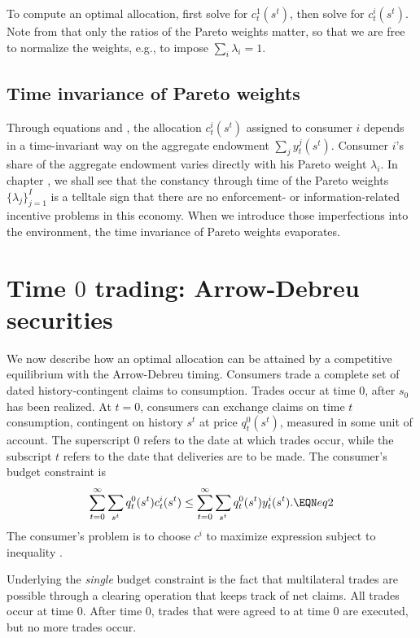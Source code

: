  To compute an optimal allocation, first solve  
for $c_t^1(s^t)$, then solve  for $c_t^i(s^t)$.
Note  from  that only the ratios of the Pareto weights matter,
so that we are free to normalize the weights, e.g., to impose
$\sum_i \lambda_i=1$.



\subsection{Time invariance of Pareto weights}
  Through  equations  and ,
the allocation $c_t^i(s^t)$ assigned to consumer $i$
depends in a time-invariant way on the aggregate endowment
$\sum_j y_t^j(s^t)$.  Consumer $i$'s share of the aggregate endowment varies
directly with his Pareto weight $\lambda_i$.   In chapter
, we shall see that the constancy through
time of the Pareto weights
 $\{\lambda_j\}_{j=1}^I$ is a telltale sign that there are no
enforcement- or information-related  incentive problems
in this economy. %
When we introduce  those imperfections  into the environment, the time invariance of  Pareto
weights evaporates.
%


\section{Time $0$ trading: Arrow-Debreu securities}
We now describe how an optimal allocation can be attained by a
competitive equilibrium with the Arrow-Debreu timing. Consumers
trade  a complete set of dated history-contingent claims to consumption. Trades occur at time $0$, after $s_0$
has been realized. At $t=0$, consumers can exchange claims on
time $t$ consumption, contingent on history $s^t$ at price
$q_t^0(s^t)$, measured in some unit of account. The superscript $0$ refers to the date at which
trades occur, while the subscript $t$ refers to the date that
deliveries are to be made.  The consumer's budget constraint is
$$ \sum_{t=0}^\infty \sum_{s^t}  q_t^0(s^t)  c_t^i(s^t)   \leq
   \sum_{t=0}^\infty \sum_{s^t}  q_t^0(s^t) y_t^i(s^t).   \EQN eq2 $$
The consumer's problem is to choose  $c^i$
to maximize expression  subject to inequality  .

Underlying the {\it single\/}  budget constraint  is the
fact that multilateral   trades are possible through a clearing
operation that keeps track of net claims.
All trades occur at time $0$.  After time $0$, trades that
were agreed to at time $0$ are executed, but no more trades occur.



